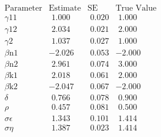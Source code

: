 \documentclass{article}
\begin{document}
\[\begin{array}{cccc}
\hline
 \text{Parameter} & \text{Estimate} & \text{SE} & \text{True Value} \\
\hline
 \text{$\gamma $11} & \text{ 1.000} & \text{ 0.020} & \text{ 1.000} \\
 \text{$\gamma $12} & \text{ 2.034} & \text{ 0.021} & \text{ 2.000} \\
 \text{$\gamma $2} & \text{ 1.037} & \text{ 0.027} & \text{ 1.000} \\
 \text{$\beta $n1} & -2.026 & \text{ 0.053} & -2.000 \\
 \text{$\beta $n2} & \text{ 2.961} & \text{ 0.074} & \text{ 3.000} \\
 \text{$\beta $k1} & \text{ 2.018} & \text{ 0.061} & \text{ 2.000} \\
 \text{$\beta $k2} & -2.047 & \text{ 0.067} & -2.000 \\
 \delta  & \text{ 0.766} & \text{ 0.078} & \text{ 0.900} \\
 \rho  & \text{ 0.457} & \text{ 0.081} & \text{ 0.500} \\
 \sigma \epsilon  & \text{ 1.343} & \text{ 0.101} & \text{ 1.414} \\
 \sigma \eta  & \text{ 1.387} & \text{ 0.023} & \text{ 1.414} \\
\end{array}\]
\end{document}
